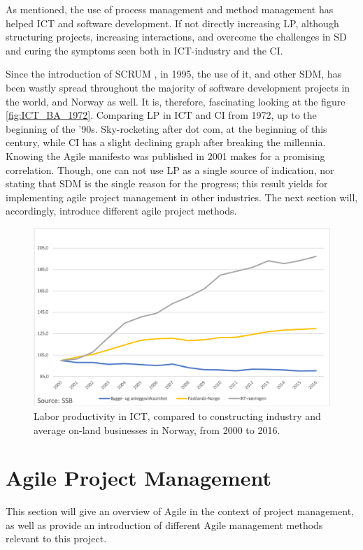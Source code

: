 As mentioned, the use of process management and method management has helped ICT and software development. If not directly increasing LP, although structuring projects, increasing interactions, and overcome the challenges in SD and curing the symptoms seen both in ICT-industry and the CI.  

Since the introduction of SCRUM \cite{sutherland}, in 1995, the use of it, and other SDM, has been wastly spread throughout the majority of software development projects in the world, and Norway as well. It is, therefore, fascinating looking at the figure \ref{fig:ICT_BA_1972}. Comparing LP in ICT and CI from 1972, up to the beginning of the '90s. Sky-rocketing after dot com, at the beginning of this century, while CI has a slight declining graph after breaking the millennia. Knowing the Agile manifesto was published in 2001 makes for a promising correlation. Though, one can not use LP as a single source of indication, nor stating that SDM is the single reason for the progress; this result yields for implementing agile project management in other industries. The next section will, accordingly, introduce different agile project methods.

\begin{figure}
    \centering
    \includegraphics[width=\textwidth]{fig/ba_on-land_ICT.png}
    \caption{Labor productivity in ICT, compared to constructing industry and average on-land businesses in Norway, from 2000 to 2016.}
    \label{fig:LP_ICT_VS}
\end{figure}

\section{Agile Project Management}
This section will give an overview of Agile in the context of project management, as well as provide an introduction of different Agile management methods relevant to this project. 

